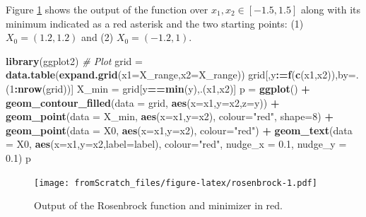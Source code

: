 \documentclass[
]{book}
\newenvironment{Shaded}{\begin{snugshade}}{\end{snugshade}}
\newcommand{\CommentTok}[1]{\textcolor[rgb]{0.56,0.35,0.01}{\textit{#1}}}
\newcommand{\DataTypeTok}[1]{\textcolor[rgb]{0.13,0.29,0.53}{#1}}
\newcommand{\DecValTok}[1]{\textcolor[rgb]{0.00,0.00,0.81}{#1}}
\newcommand{\ErrorTok}[1]{\textcolor[rgb]{0.64,0.00,0.00}{\textbf{#1}}}
\newcommand{\FloatTok}[1]{\textcolor[rgb]{0.00,0.00,0.81}{#1}}
\newcommand{\KeywordTok}[1]{\textcolor[rgb]{0.13,0.29,0.53}{\textbf{#1}}}
\newcommand{\NormalTok}[1]{#1}
\newcommand{\OperatorTok}[1]{\textcolor[rgb]{0.81,0.36,0.00}{\textbf{#1}}}
\newcommand{\StringTok}[1]{\textcolor[rgb]{0.31,0.60,0.02}{#1}}
\begin{document}
Figure \ref{fig:rosenbrock} shows the output of the function over \(x_1,x_2 \in [-1.5, 1.5]\) along with its minimum indicated as a red asterisk and the two starting points: (1) \(X_0=(1.2,1.2)\) and (2) \(X_0=(-1.2,1)\).

\begin{Shaded}
\begin{Highlighting}[]
\KeywordTok{library}\NormalTok{(ggplot2)}
\CommentTok{# Plot}
\NormalTok{grid =}\StringTok{ }\KeywordTok{data.table}\NormalTok{(}\KeywordTok{expand.grid}\NormalTok{(}\DataTypeTok{x1=}\NormalTok{X_range,}\DataTypeTok{x2=}\NormalTok{X_range))}
\NormalTok{grid[,y}\OperatorTok{:}\ErrorTok{=}\KeywordTok{f}\NormalTok{(}\KeywordTok{c}\NormalTok{(x1,x2)),by=.(}\DecValTok{1}\OperatorTok{:}\KeywordTok{nrow}\NormalTok{(grid))]}
\NormalTok{X_min =}\StringTok{ }\NormalTok{grid[y}\OperatorTok{==}\KeywordTok{min}\NormalTok{(y),.(x1,x2)]}
\NormalTok{p =}\StringTok{ }\KeywordTok{ggplot}\NormalTok{() }\OperatorTok{+}
\StringTok{  }\KeywordTok{geom_contour_filled}\NormalTok{(}\DataTypeTok{data =}\NormalTok{ grid, }\KeywordTok{aes}\NormalTok{(}\DataTypeTok{x=}\NormalTok{x1,}\DataTypeTok{y=}\NormalTok{x2,}\DataTypeTok{z=}\NormalTok{y)) }\OperatorTok{+}
\StringTok{  }\KeywordTok{geom_point}\NormalTok{(}\DataTypeTok{data =}\NormalTok{ X_min, }\KeywordTok{aes}\NormalTok{(}\DataTypeTok{x=}\NormalTok{x1,}\DataTypeTok{y=}\NormalTok{x2), }\DataTypeTok{colour=}\StringTok{"red"}\NormalTok{, }\DataTypeTok{shape=}\DecValTok{8}\NormalTok{) }\OperatorTok{+}
\StringTok{  }\KeywordTok{geom_point}\NormalTok{(}\DataTypeTok{data =}\NormalTok{ X0, }\KeywordTok{aes}\NormalTok{(}\DataTypeTok{x=}\NormalTok{x1,}\DataTypeTok{y=}\NormalTok{x2), }\DataTypeTok{colour=}\StringTok{"red"}\NormalTok{) }\OperatorTok{+}\StringTok{ }
\StringTok{  }\KeywordTok{geom_text}\NormalTok{(}\DataTypeTok{data =}\NormalTok{ X0, }\KeywordTok{aes}\NormalTok{(}\DataTypeTok{x=}\NormalTok{x1,}\DataTypeTok{y=}\NormalTok{x2,}\DataTypeTok{label=}\NormalTok{label), }\DataTypeTok{colour=}\StringTok{"red"}\NormalTok{, }\DataTypeTok{nudge_x =} \FloatTok{0.1}\NormalTok{, }\DataTypeTok{nudge_y =} \FloatTok{0.1}\NormalTok{)}
\NormalTok{p}
\end{Highlighting}
\end{Shaded}

\begin{figure}
\centering
\texttt{[image: fromScratch\_files/figure-latex/rosenbrock-1.pdf]}
\caption{\label{fig:rosenbrock}Output of the Rosenbrock function and minimizer in red.}
\end{figure}
\end{document}
